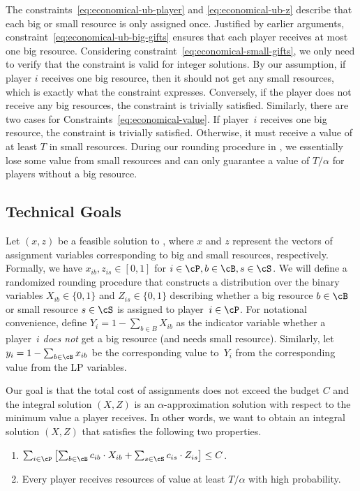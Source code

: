 The constraints~\eqref{eq:economical-ub-player} and \eqref{eq:economical-ub-z} describe that
each big or small resource is only assigned once.
Justified by earlier arguments, constraint~\eqref{eq:economical-ub-big-gifts} ensures that each player receives at most one big resource.
Considering constraint~\eqref{eq:economical-small-gifts}, we only need to verify that the constraint is valid for integer solutions.
By our
assumption, if player $i$ receives one big resource, then it should not get any small resources,
which is exactly what the constraint expresses. Conversely, if the player does not receive any big resources, the
constraint is trivially satisfied. Similarly, there are two cases for
Constraints~\eqref{eq:economical-value}. If
player~$i$ receives one big resource, the constraint is trivially satisfied. Otherwise, it must receive a value of at least $T$ in small resources. During our rounding procedure in , we essentially lose
some value from small resources and can only guarantee
a value of $T/\alpha$ for players without a big resource.

\subsection{Technical Goals}
Let $(x, z)$ be a feasible solution to , where $x$ and $z$ represent the vectors of assignment variables corresponding to big and small resources, respectively. Formally, we have $x_{ib}, z_{is} \in [0,1]$ for $i \in \cP, b\in \cB, s \in \cS$.
We will define a randomized rounding procedure that constructs
a distribution over the binary variables
$X_{ib} \in \{0,1\}$ and $Z_{is}\in\{0, 1\}$ describing whether a big resource $b \in \cB$ or small resource $s\in \cS$ is assigned to player~$i \in \cP$.
For notational convenience, define $Y_i = 1 - \sum_{b\in B} X_{ib}$ as the indicator variable whether a player~$i$ \emph{does not}
get a big resource (and needs small resource). Similarly, let $y_i = 1 - \sum_{b\in \cB} x_{ib}$ be the corresponding value to~$Y_i$ from the corresponding value from the LP variables.

Our goal is that the total cost of assignments does not exceed the budget $C$ and the integral solution $(X,Z)$ is an $\alpha$-approximation solution with respect to the minimum value a player
receives. In other words, we want to obtain an integral solution $(X,Z)$ that satisfies the following two properties.
\smallskip
\begin{enumerate}
    \item $\sum_{i \in \cP}^{} \left[\sum_{b \in \cB}^{}c_{ib}\cdot X_{ib} + \sum_{s \in \cS}^{}c_{is}\cdot Z_{is} \right] \leq C$.
    
    \item Every player receives resources of value at least $T/\alpha$ with high probability.
\end{enumerate}

